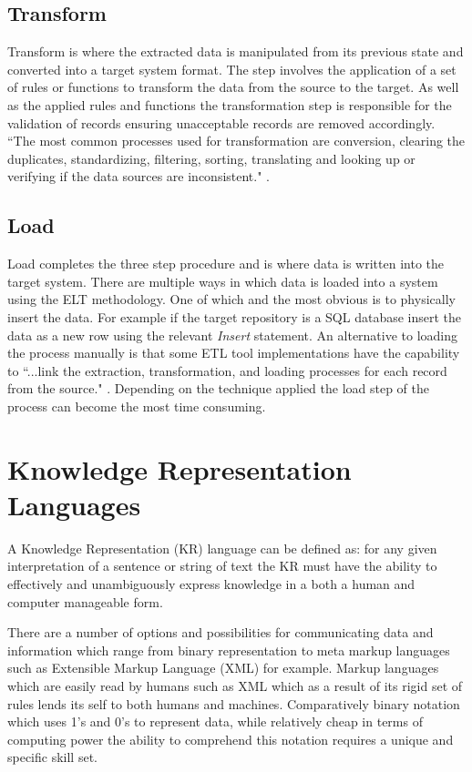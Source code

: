 \subsection{Transform}
Transform is where the extracted data is manipulated from its previous state and converted into a target system format. The step involves the application of a set of rules or functions to transform the data from the source to the target. As well as the applied rules and functions the transformation step is responsible for the validation of records ensuring unacceptable records are removed accordingly. ``The most common processes used for transformation are conversion, clearing the duplicates, standardizing, filtering, sorting, translating and looking up or verifying if the data sources are inconsistent." \cite{etlref2}.

\subsection{Load}
Load completes the three step procedure and is where data is written into the target system. There are multiple ways in which data is loaded into a system using the ELT methodology. One of which and the most obvious is to physically insert the data. For example if the target repository is a SQL database insert the data as a new row using the relevant \textit{Insert} statement. An alternative to loading the process manually is that some ETL tool implementations have the capability to ``...link the extraction, transformation, and loading processes for each record from the source." \cite{etlref2}. Depending on the technique applied the load step of the process can become the most time consuming.

\section{Knowledge Representation Languages}
A Knowledge Representation (KR) language can be defined as: for any given interpretation of a sentence or string of text the KR must have the ability to effectively and unambiguously express knowledge in a both a human and computer manageable form. 

There are a number of options and possibilities for communicating data and information which range from binary representation to meta markup languages such as Extensible Markup Language (XML) for example. Markup languages which are easily read by humans such as XML which as a result of its rigid set of rules lends its self to both humans and machines. Comparatively binary notation which uses 1's and 0's to represent data, while relatively cheap in terms of computing power the ability to comprehend this notation requires a unique and specific skill set.

